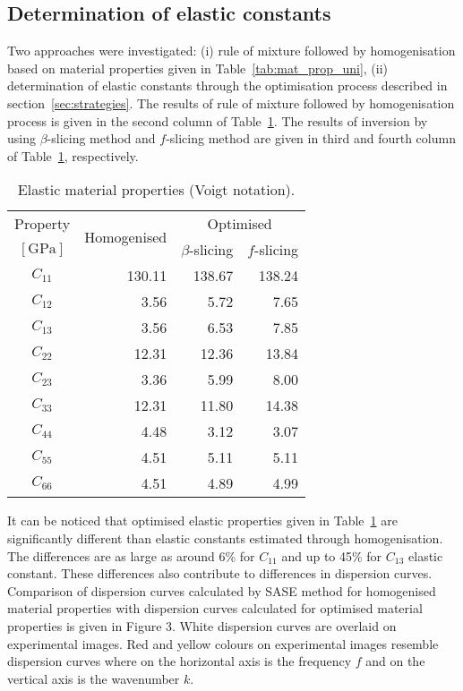 \documentclass[preprint,12pt]{elsarticle}
\begin{document}
\subsection{Determination of elastic constants}
Two approaches were investigated: (i) rule of mixture followed by homogenisation based on material properties given in Table~\ref{tab:mat_prop_uni}, (ii) determination of elastic constants through the optimisation process described in section~\ref{sec:strategies}. 
The results of rule of mixture followed by homogenisation process is given in the second column of Table~\ref{tab:mat_prop_identified}.
The results of inversion by using $\beta$-slicing method and $f$-slicing method are given in third and fourth column of Table~\ref{tab:mat_prop_identified}, respectively.
\begin{table}[h]
	\renewcommand{\arraystretch}{1.3}
	\centering \footnotesize
	\caption{Elastic material properties (Voigt notation).}
	\begin{tabular}{crrr} 
		\toprule
		Property & \multirow{2}{*}{Homogenised} & \multicolumn{2}{c}{Optimised}\\
		\cmidrule(lr){3-4}
		$\left[\textrm{GPa}\right]$ &  & $\beta$-slicing & $f$-slicing \\ 
		\midrule 
		$C_{11}$ & 130.11 & 138.67 & 138.24 \\ 
		$C_{12}$ & 3.56   & 5.72   & 7.65\\ 
		$C_{13}$ & 3.56   & 6.53   & 7.85\\
		$C_{22}$ & 12.31  & 12.36  & 13.84\\
		$C_{23}$ & 3.36   & 5.99  & 8.00\\
		$C_{33}$ & 12.31  & 11.80 & 14.38\\
		$C_{44}$ & 4.48   & 3.12  & 3.07\\
		$C_{55}$ & 4.51   & 5.11  & 5.11\\
		$C_{66}$ & 4.51   & 4.89  & 4.99 \\
		\bottomrule
	\end{tabular} 
	\label{tab:mat_prop_identified}
\end{table}
It can be noticed that optimised elastic properties given in Table~\ref{tab:mat_prop_identified} are significantly different than elastic constants estimated through homogenisation. 
The differences are as large as around 6\% for $C_{11}$ and up to 45\% for $C_{13}$ elastic constant.
These differences also contribute to differences in dispersion curves. 
Comparison of dispersion curves calculated by SASE method for homogenised material properties with dispersion curves calculated for optimised material properties is given in Figure 3. 
White dispersion curves are overlaid on experimental images. 
Red and yellow colours on experimental images resemble dispersion curves where on the horizontal axis is the frequency $f$ and on the vertical axis is the wavenumber $k$. 
\end{document}
